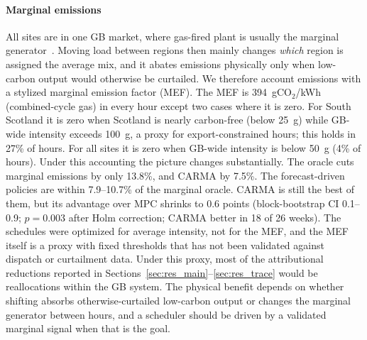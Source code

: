 \paragraph{Marginal emissions} All sites are in one GB market, where gas-fired plant is usually the marginal generator~\cite{staffell2017measuring,hawkes2010estimating}. Moving load between regions then mainly changes \emph{which} region is assigned the average mix, and it abates emissions physically only when low-carbon output would otherwise be curtailed. We therefore account emissions with a stylized marginal emission factor (MEF). The MEF is 394~gCO$_2$/kWh (combined-cycle gas) in every hour except two cases where it is zero. For South Scotland it is zero when Scotland is nearly carbon-free (below 25~g) while GB-wide intensity exceeds 100~g, a proxy for export-constrained hours; this holds in 27\% of hours. For all sites it is zero when GB-wide intensity is below 50~g (4\% of hours). Under this accounting the picture changes substantially. The oracle cuts marginal emissions by only 13.8\%, and CARMA by 7.5\%. The forecast-driven policies are within 7.9--10.7\% of the marginal oracle. CARMA is still the best of them, but its advantage over MPC shrinks to 0.6 points (block-bootstrap CI 0.1--0.9; $p=0.003$ after Holm correction; CARMA better in 18 of 26 weeks). The schedules were optimized for average intensity, not for the MEF, and the MEF itself is a proxy with fixed thresholds that has not been validated against dispatch or curtailment data. Under this proxy, most of the attributional reductions reported in Sections~\ref{sec:res_main}--\ref{sec:res_trace} would be reallocations within the GB system. The physical benefit depends on whether shifting absorbs otherwise-curtailed low-carbon output or changes the marginal generator between hours, and a scheduler should be driven by a validated marginal signal when that is the goal.
